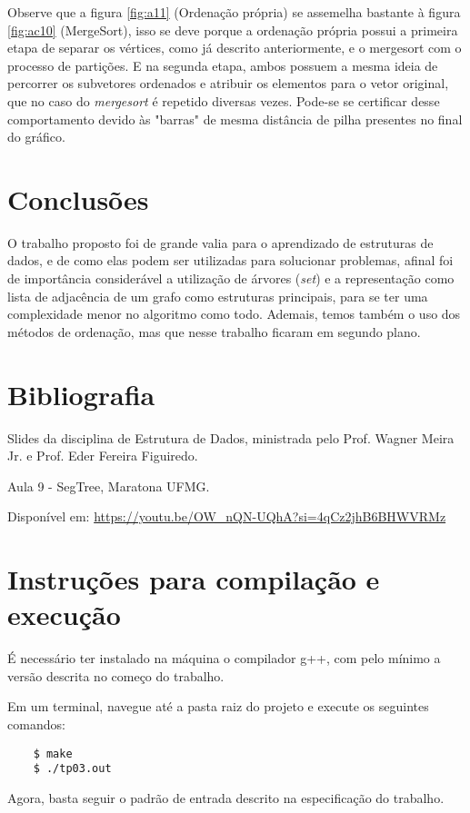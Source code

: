 \documentclass{article}
\begin{document}

Observe que a figura \ref{fig:a11} (Ordenação própria) se assemelha bastante à figura \ref{fig:ac10} (MergeSort), isso se deve porque a ordenação própria possui a primeira etapa de separar os vértices, como já descrito anteriormente, e o mergesort com o processo de partições. 
E na segunda etapa, ambos possuem a mesma ideia de percorrer os subvetores ordenados e atribuir os elementos para o vetor original, que no caso do \emph{mergesort} é repetido diversas vezes. Pode-se se certificar desse comportamento devido às "barras" de mesma distância de pilha presentes no final do gráfico. 


\section{Conclusões}

O trabalho proposto foi de grande valia para o aprendizado de estruturas de dados, e de como elas podem ser utilizadas para solucionar problemas, afinal foi de importância considerável a utilização de árvores (\emph{set}) e a representação como lista de adjacência de um grafo como estruturas principais, para se ter uma complexidade menor no algoritmo como todo. Ademais, temos também o uso dos métodos de ordenação, mas que nesse trabalho ficaram em segundo plano.


\section*{Bibliografia}

Slides da disciplina de Estrutura de Dados, ministrada pelo Prof. Wagner Meira Jr. e Prof. Eder Fereira Figuiredo.


Aula 9 - SegTree, Maratona UFMG. 

Disponível em: \url{https://youtu.be/OW_nQN-UQhA?si=4qCz2jhB6BHWVRMz}

\section*{Instruções para compilação e execução}

É necessário ter instalado na máquina o compilador g++, com pelo mínimo a versão descrita no começo do trabalho.  

Em um terminal, navegue até a pasta raiz do projeto e execute os seguintes comandos:

\begin{verbatim}
    $ make
    $ ./tp03.out

\end{verbatim}

Agora, basta seguir o padrão de entrada descrito na especificação do trabalho.
\end{document}
